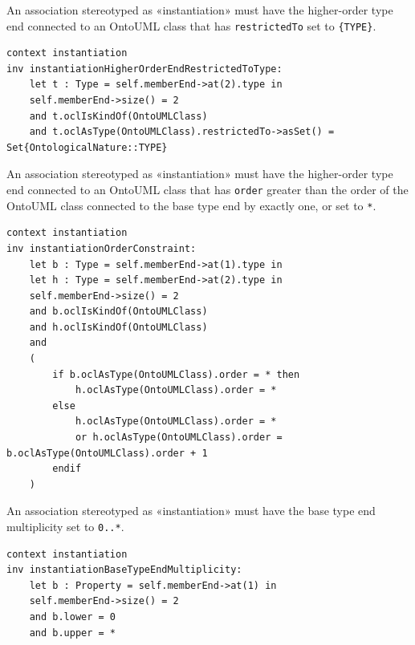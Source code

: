 \begin{constraint}
\label{constraint:instantiationHigherOrderEndRestrictedToType}
An association stereotyped as «instantiation» must have the higher-order type end connected to an OntoUML class that has \texttt{restrictedTo} set to \texttt{\{TYPE\}}.

\begin{lstlisting}[language=OCL]
context instantiation
inv instantiationHigherOrderEndRestrictedToType:
    let t : Type = self.memberEnd->at(2).type in
    self.memberEnd->size() = 2
    and t.oclIsKindOf(OntoUMLClass)
    and t.oclAsType(OntoUMLClass).restrictedTo->asSet() = Set{OntologicalNature::TYPE}
\end{lstlisting}
\end{constraint}

\begin{constraint}
\label{constraint:instantiationOrderConstraint}
An association stereotyped as «instantiation» must have the higher-order type end connected to an OntoUML class that has \texttt{order} greater than the order of the OntoUML class connected to the base type end by exactly one, or set to \texttt{*}.

\begin{lstlisting}[language=OCL]
context instantiation
inv instantiationOrderConstraint:
    let b : Type = self.memberEnd->at(1).type in
    let h : Type = self.memberEnd->at(2).type in
    self.memberEnd->size() = 2
    and b.oclIsKindOf(OntoUMLClass)
    and h.oclIsKindOf(OntoUMLClass)
    and
    (
        if b.oclAsType(OntoUMLClass).order = * then
            h.oclAsType(OntoUMLClass).order = *
        else
            h.oclAsType(OntoUMLClass).order = *
            or h.oclAsType(OntoUMLClass).order = b.oclAsType(OntoUMLClass).order + 1
        endif
    )
\end{lstlisting}
\end{constraint}

\begin{constraint}
\label{constraint:instantiationBaseTypeEndMultiplicity}
An association stereotyped as «instantiation» must have the base type end multiplicity set to \texttt{0..*}.

\begin{lstlisting}[language=OCL]
context instantiation
inv instantiationBaseTypeEndMultiplicity:
    let b : Property = self.memberEnd->at(1) in
    self.memberEnd->size() = 2
    and b.lower = 0
    and b.upper = *
\end{lstlisting}
\end{constraint}

